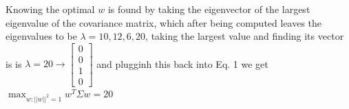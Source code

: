 \begin{Q}
\begin{enumerate}
Knowing the optimal $w$ is found by taking the eigenvector of the largest eigenvalue of the covariance matrix, which after being computed leaves the eigenvalues to be $\lambda = 10, 12, 6, 20$, taking the largest value and finding its vector is is $\lambda = 20 \rightarrow \left[ \begin{matrix} 0 \\ 0 \\ 1 \\ 0 \end{matrix} \right]$ and plugginh this back into Eq. 1 we get $\max_{w:||w||^2=1}w^T\Sigma w = 20$


\end{enumerate}
\end{Q}
          